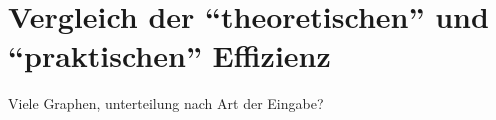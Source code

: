 \chapter{Vergleich der \enquote{theoretischen} und \enquote{praktischen} Effizienz}
\label{cha:ergebnisse}

Viele Graphen, unterteilung nach Art der Eingabe?